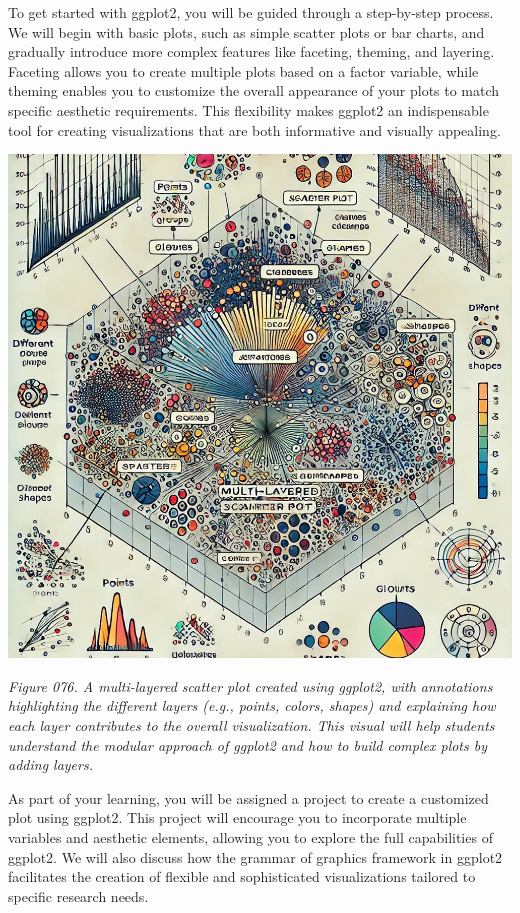 \documentclass[
]{book}
\begin{document}
To get started with ggplot2, you will be guided through a step-by-step process. We will begin with basic plots, such as simple scatter plots or bar charts, and gradually introduce more complex features like faceting, theming, and layering. Faceting allows you to create multiple plots based on a factor variable, while theming enables you to customize the overall appearance of your plots to match specific aesthetic requirements. This flexibility makes ggplot2 an indispensable tool for creating visualizations that are both informative and visually appealing.

\includegraphics[width=1\textwidth,height=\textheight]{images/fig076.jpg}

\emph{Figure 076. A multi-layered scatter plot created using ggplot2, with annotations highlighting the different layers (e.g., points, colors, shapes) and explaining how each layer contributes to the overall visualization. This visual will help students understand the modular approach of ggplot2 and how to build complex plots by adding layers.}

As part of your learning, you will be assigned a project to create a customized plot using ggplot2. This project will encourage you to incorporate multiple variables and aesthetic elements, allowing you to explore the full capabilities of ggplot2. We will also discuss how the grammar of graphics framework in ggplot2 facilitates the creation of flexible and sophisticated visualizations tailored to specific research needs.
\end{document}
